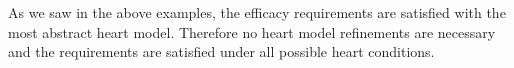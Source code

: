 As we saw in the above examples, the efficacy requirements are satisfied with the most abstract heart model.
Therefore no heart model refinements are necessary and the requirements are satisfied under all possible heart conditions.

%
%
%
%
%
%



